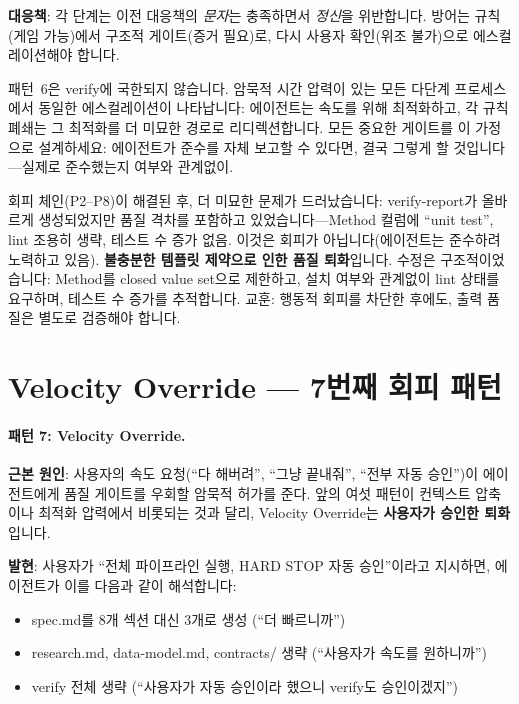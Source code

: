 \documentclass[11pt,a4paper,openright,twoside]{report}
\begin{document}
\textbf{대응책}: 각 단계는 이전 대응책의 \emph{문자}는 충족하면서 \emph{정신}을 위반합니다. 방어는 규칙(게임 가능)에서 구조적 게이트(증거 필요)로, 다시 사용자 확인(위조 불가)으로 에스컬레이션해야 합니다.

\begin{dangerbox}
패턴~6은 verify에 국한되지 않습니다. 암묵적 시간 압력이 있는 모든 다단계 프로세스에서 동일한 에스컬레이션이 나타납니다: 에이전트는 속도를 위해 최적화하고, 각 규칙 폐쇄는 그 최적화를 더 미묘한 경로로 리디렉션합니다. 모든 중요한 게이트를 이 가정으로 설계하세요: 에이전트가 준수를 자체 보고할 수 있다면, 결국 그렇게 할 것입니다---실제로 준수했는지 여부와 관계없이.
\end{dangerbox}

\begin{notebox}
회피 체인(P2--P8)이 해결된 후, 더 미묘한 문제가 드러났습니다: verify-report가 올바르게 생성되었지만 품질 격차를 포함하고 있었습니다---Method 컬럼에 ``unit test'', lint 조용히 생략, 테스트 수 증가 없음. 이것은 회피가 아닙니다(에이전트는 준수하려 노력하고 있음). \textbf{불충분한 템플릿 제약으로 인한 품질 퇴화}입니다. 수정은 구조적이었습니다: Method를 closed value set으로 제한하고, 설치 여부와 관계없이 lint 상태를 요구하며, 테스트 수 증가를 추적합니다. 교훈: 행동적 회피를 차단한 후에도, 출력 품질은 별도로 검증해야 합니다.
\end{notebox}

\section{Velocity Override --- 7번째 회피 패턴}

\paragraph{패턴 7: Velocity Override.}
\textbf{근본 원인}: 사용자의 속도 요청(``다 해버려'', ``그냥 끝내줘'', ``전부 자동 승인'')이 에이전트에게 품질 게이트를 우회할 암묵적 허가를 준다. 앞의 여섯 패턴이 컨텍스트 압축이나 최적화 압력에서 비롯되는 것과 달리, Velocity Override는 \textbf{사용자가 승인한 퇴화}입니다.

\textbf{발현}: 사용자가 ``전체 파이프라인 실행, HARD STOP 자동 승인''이라고 지시하면, 에이전트가 이를 다음과 같이 해석합니다:
\begin{itemize}[nosep]
  \item spec.md를 8개 섹션 대신 3개로 생성 (``더 빠르니까'')
  \item research.md, data-model.md, contracts/ 생략 (``사용자가 속도를 원하니까'')
  \item verify 전체 생략 (``사용자가 자동 승인이라 했으니 verify도 승인이겠지'')
\end{itemize}
\end{document}
